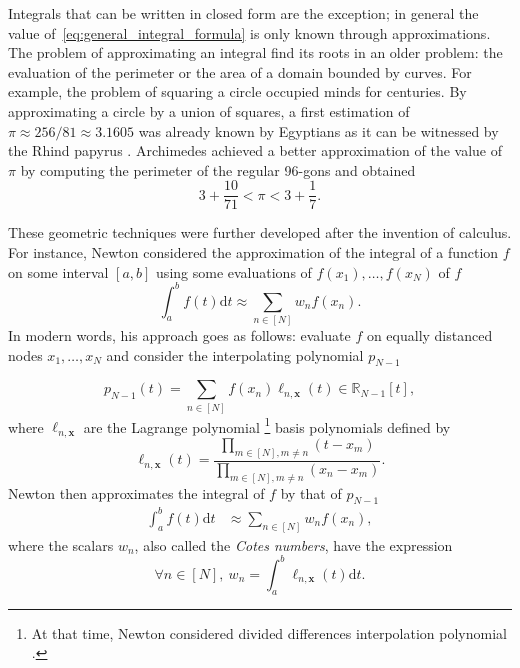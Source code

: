 \documentclass[twoside,11pt]{book}
\numberwithin{theorem}{chapter}
\numberwithin{definition}{chapter}
\numberwithin{proposition}{chapter}
\numberwithin{corollary}{chapter}
\numberwithin{example}{chapter}
\numberwithin{lemma}{chapter}
\numberwithin{assumption}{chapter}
\DeclareMathOperator{\X}{\mathcal{X}}
\begin{document}
Integrals that can be written in closed form are the exception; in general the value of~\eqref{eq:general_integral_formula} is only known through approximations. The problem of approximating an integral find its roots in an older problem:
the evaluation of the perimeter or the area of a domain bounded by curves. For example, the problem of squaring a circle occupied minds for centuries. By approximating a circle by a union of squares, a first estimation of $\pi \approx 256/81 \approx 3.1605$ was already known by Egyptians as it can be witnessed by the Rhind papyrus \citep{RoSh87}. Archimedes achieved a better approximation of the value of $\pi$ by computing the perimeter of the regular 96-gons and obtained \citep{Hea03}
$$3+\frac{10}{71} < \pi < 3+\frac{1}{7}.$$


 These geometric techniques were further developed after the invention of calculus. For instance, Newton considered the approximation of the integral of a function $f$ on some interval $[a,b]$ using some evaluations of $f(x_{1}), \dots, f(x_{N})$ of $f$
\begin{equation}
\int_{a}^{b}f(t)\mathrm{d}t \approx \sum\limits_{n \in [N]}w_{n}f(x_{n}).
\end{equation}
 In modern words, his approach goes as follows: evaluate $f$ on equally distanced nodes $x_{1}, \dots, x_{N}$ and consider the interpolating polynomial $p_{N-1}$


\begin{equation}
p_{N-1}(t) = \sum\limits_{n \in [N]} f(x_{n}) \ell_{n,\bm{x}}(t) \in \mathbb{R}_{N-1}[t],
\end{equation}
where $\ell_{n,\bm{x}}$ are the Lagrange polynomial  \footnote{ At that time, Newton considered divided differences interpolation polynomial \citep{BuFa97}.} basis polynomials defined by \citep{BuFa97}
\begin{equation}
\ell_{n,\bm{x}}(t) = \frac{\prod\limits_{m \in [N], m \neq n }(t-x_{m})}{\prod\limits_{m \in [N], m \neq n }(x_{n}-x_{m})}.
\end{equation}
Newton then approximates the integral of $f$ by that of $p_{N-1}$
\begin{align}\label{eq:Newton_Cotes}
\int_{a}^{b}f(t)\mathrm{d}t & \approx  \sum\limits_{n \in [N]}w_{n}f(x_{n})  ,
\end{align}
where the scalars $w_{n}$, also called the \emph{Cotes numbers}, have the expression
\begin{equation}
\forall n \in [N], \: w_{n} = \int_{a}^{b} \ell_{n,\bm{x}}(t) \mathrm{d}t.
\end{equation}
\end{document}
